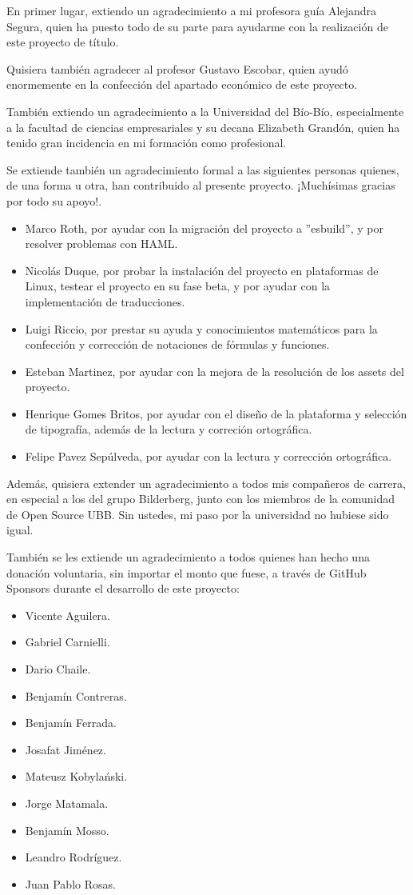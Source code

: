 En primer lugar, extiendo un agradecimiento a mi profesora guía Alejandra Segura, quien ha puesto todo de su parte para ayudarme con la realización de este proyecto de título.

Quisiera también agradecer al profesor Gustavo Escobar, quien ayudó enormemente en la confección del apartado económico de este proyecto.

También extiendo un agradecimiento a la Universidad del Bío-Bío, especialmente a la facultad de ciencias empresariales y su decana Elizabeth Grandón, quien ha tenido gran incidencia en mi formación como profesional.

Se extiende también un agradecimiento formal a las siguientes personas quienes, de una forma u otra, han contribuido al presente proyecto. ¡Muchísimas gracias por todo su apoyo!.

\begin{itemize}
	\item Marco Roth, por ayudar con la migración del proyecto a ''esbuild'', y por resolver problemas con HAML.
	\item Nicolás Duque, por probar la instalación del proyecto en plataformas de Linux, testear el proyecto en su fase beta, y por ayudar con la implementación de traducciones.
	\item Luigi Riccio, por prestar su ayuda y conocimientos matemáticos para la confección y corrección de notaciones de fórmulas y funciones. 
	\item Esteban Martinez, por ayudar con la mejora de la resolución de los assets del proyecto.
	\item Henrique Gomes Britos, por ayudar con el diseño de la plataforma y selección de tipografía, además de la lectura y correción ortográfica.
  \item Felipe Pavez Sepúlveda, por ayudar con la lectura y corrección ortográfica.
\end{itemize}

Además, quisiera extender un agradecimiento a todos mis compañeros de carrera, en especial a los del grupo Bilderberg, junto con los miembros de la comunidad de Open Source UBB. Sin ustedes, mi paso por la universidad no hubiese sido igual.

También se les extiende un agradecimiento a todos quienes han hecho una donación voluntaria, sin importar el monto que fuese, a través de GitHub Sponsors durante el desarrollo de este proyecto:
\begin{itemize}
  \item Vicente Aguilera.
  \item Gabriel Carnielli.
  \item Dario Chaile.
  \item Benjamín Contreras.
  \item Benjamín Ferrada.
  \item Josafat Jiménez.
  \item  Mateusz Kobylański.
  \item Jorge Matamala.
  \item Benjamín Mosso.
  \item Leandro Rodríguez.
  \item Juan Pablo Rosas.
\end{itemize}
